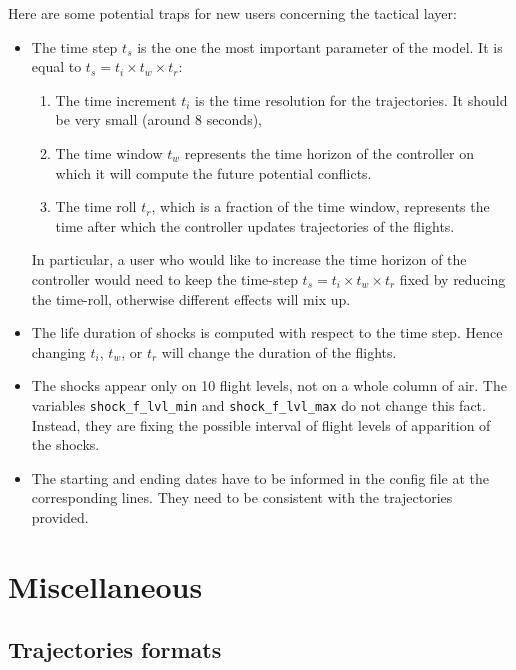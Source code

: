 \documentclass[12pt]{article}
\begin{document}
Here are some potential traps for new users concerning the tactical layer:
\begin{itemize}
\item The time step $t_s$ is the one the most important parameter of the model. It is equal to $t_s = t_i \times t_w\times t_r$:
\begin{enumerate}
\item The time increment $t_i$ is the time resolution for the trajectories. It should be very small (around 8 seconds),
\item The time window $t_w$ represents the time horizon of the controller on which it will compute the future potential conflicts.
\item The time roll $t_r$, which is a fraction of the time window, represents the time after which the controller updates trajectories of the flights.
\end{enumerate}
In particular, a user who would like to increase the time horizon of the controller would need to keep the time-step $t_s = t_i \times t_w\times t_r$ fixed by reducing the time-roll, otherwise different effects will mix up.
\item The life duration of shocks is computed with respect to the time step. Hence changing $t_i$, $t_w$, or $t_r$ will change the duration of the flights.
\item The shocks appear only on 10 flight levels, not on a whole column of air. The variables \verb|shock_f_lvl_min| and \verb|shock_f_lvl_max| do not change this fact. Instead, they are fixing the possible interval of flight levels of apparition of the shocks.
\item The starting and ending dates have to be informed in the config file at the corresponding lines. They need to be consistent with the trajectories provided. 
\end{itemize}

\section{Miscellaneous}

\subsection{Trajectories formats}
\end{document}
